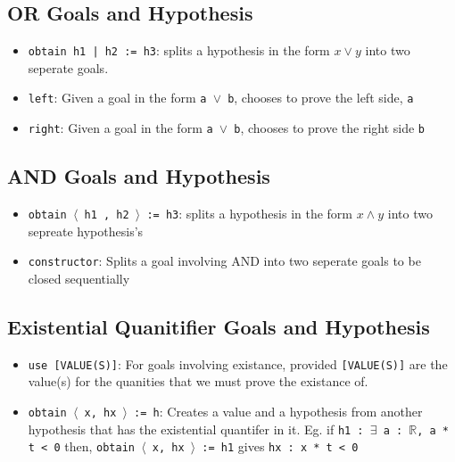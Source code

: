 \documentclass{exam}
\newcommand{\RR}{\mathbb R}
\begin{document}
    \subsection*{OR Goals and Hypothesis}
    \begin{itemize}
        \item \verb+obtain h1 | h2 := h3+: splits a hypothesis in the form $x \lor y$ into two seperate goals.
        \item \verb|left|: Given a goal in the form \texttt{a $\lor$ b}, chooses to prove the left side, \texttt{a}
        \item \verb|right|: Given a goal in the form \texttt{a $\lor$ b}, chooses to prove the right side \texttt{b}
    \end{itemize}
    \subsection*{AND Goals and Hypothesis}
    \begin{itemize}
        \item \texttt{obtain $\langle$ h1 , h2 $\rangle$ := h3}: splits a hypothesis in the form $x \land y$ into two sepreate hypothesis's
        \item \verb|constructor|: Splits a goal involving AND into two seperate goals to be closed sequentially
    \end{itemize}
    \subsection*{Existential Quanitifier Goals and Hypothesis}
    \begin{itemize}
        \item \verb|use [VALUE(S)]|: For goals involving existance, provided \texttt{[VALUE(S)]} are the value(s) for the quanities that we must prove the existance of.
        \item \texttt{obtain $\langle$ x, hx $\rangle$ := h}: Creates a value and a hypothesis from another hypothesis that has the existential quantifer in it. Eg. if \texttt{h1 : $\exists$ a : $\RR$, a * t < 0} then, \texttt{obtain $\langle$ x, hx $\rangle$ := h1} gives \texttt{hx : x * t < 0}
    \end{itemize}
\end{document}
